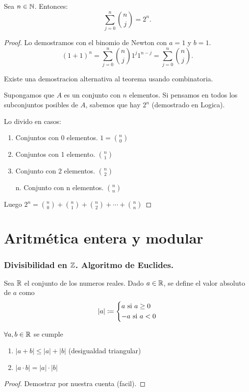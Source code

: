 \begin{theorem}
	Sea \(n \in \mathbb{N} \). Entonces:
	\[
		\sum_{j =0 }^{n } \binom{n }{j } = 2^{n }.
	\]
\end{theorem}
\begin{proof}
	Lo demostramos con el binomio de Newton con \(a = 1 \) y \(b = 1 \).
	\[
		(1+1)^{n} = \sum_{j =0 }^{n } \binom{n }{j} 1^{j} 1^{n -j} = \sum_{j =0 }^{n } \binom{n }{j}.
	\]
	
	Existe una demostracion alternativa al teorema usando combinatoria.
	
	Supongamos que \(A \) es un conjunto con \(n \) elementos. Si pensamos en todos los subconjuntos posibles de \(A \), sabemos que hay \(2^{n } \) (demostrado en Logica).
	
	Lo divido en casos:
	\begin{enumerate}
		\item Conjuntos con 0 elementos. \(1 = \binom{n }{0 }\)
		\item Conjuntos con 1 elemento. \(\binom{n }{1 }\)
		\item Conjunto con 2 elementos. \(\binom{n }{2}\)
		\item[n.] Conjunto con n elementos. \(\binom{n }{n }\)
	\end{enumerate}
	Luego \(2^{n }= \binom{n }{0 } + \binom{n}{1 } + \binom{n }{2 } + \cdots + \binom{n }{n }\)
\end{proof}

\part{Aritmética entera y modular}
\section{Divisibilidad en \(\mathbb{Z} \). Algoritmo de Euclides.}
\begin{definition}
	Sea \(\mathbb{R} \) el conjunto de los numeros reales. Dado \(a \in \mathbb{R} \), se define el valor absoluto de \(a \) como
	\[
		|a| \coloneqq \begin{dcases}
			a \text{ si } a \geq 0 \\
			-a \text{ si } a < 0
		\end{dcases}
	\]
\end{definition}

\begin{proposition}
	\(\forall  a,b \in \mathbb{R} \) se cumple
	\begin{enumerate}
		\item \(|a + b| \leq |a| + |b| \) (desigualdad triangular)
		\item \(|a \cdot b | = |a| \cdot |b| \)
	\end{enumerate}
\end{proposition}
\begin{proof}
	Demostrar por nuestra cuenta (facil).
\end{proof}

